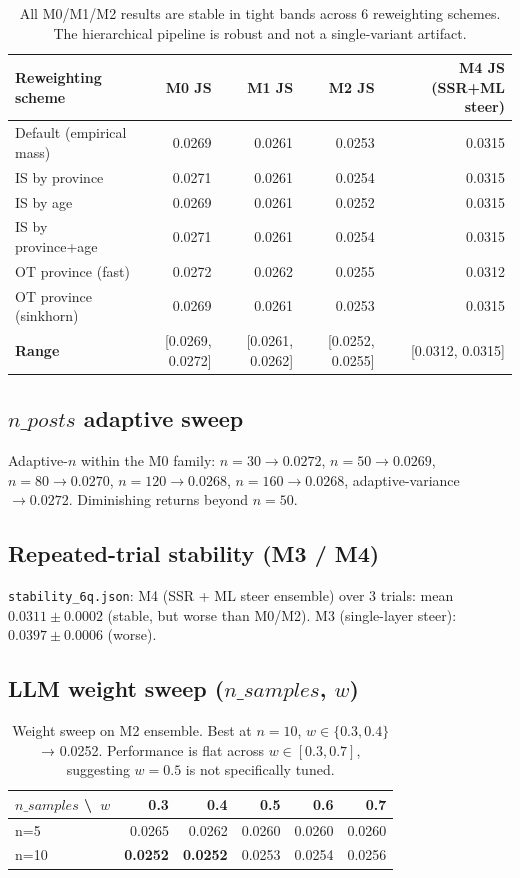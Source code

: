 \documentclass[10pt,a4paper]{article}
\newcommand{\good}[1]{\textcolor{green!50!black}{\textbf{#1}}}
\begin{document}
\begin{table}[H]
\centering
\small
\begin{tabular}{l r r r r}
\toprule
\textbf{Reweighting scheme} & \textbf{M0 JS} & \textbf{M1 JS} & \textbf{M2 JS} & \textbf{M4 JS (SSR+ML steer)} \\
\midrule
Default (empirical mass) & 0.0269 & 0.0261 & 0.0253 & 0.0315 \\
IS by province & 0.0271 & 0.0261 & 0.0254 & 0.0315 \\
IS by age & 0.0269 & 0.0261 & 0.0252 & 0.0315 \\
IS by province+age & 0.0271 & 0.0261 & 0.0254 & 0.0315 \\
OT province (fast) & 0.0272 & 0.0262 & 0.0255 & 0.0312 \\
OT province (sinkhorn) & 0.0269 & 0.0261 & 0.0253 & 0.0315 \\
\midrule
\textbf{Range} & [0.0269, 0.0272] & [0.0261, 0.0262] & [0.0252, 0.0255] & [0.0312, 0.0315] \\
\bottomrule
\end{tabular}
\caption{All M0/M1/M2 results are stable in tight bands across 6 reweighting schemes. The hierarchical pipeline is robust and not a single-variant artifact.}
\end{table}

\subsection{$n\_posts$ adaptive sweep}

Adaptive-$n$ within the M0 family: $n=30 \to 0.0272$, $n=50 \to 0.0269$, $n=80 \to 0.0270$, $n=120 \to 0.0268$, $n=160 \to 0.0268$, adaptive-variance $\to 0.0272$. Diminishing returns beyond $n{=}50$.

\subsection{Repeated-trial stability (M3 / M4)}

\texttt{stability\_6q.json}: M4 (SSR + ML steer ensemble) over 3 trials: mean $0.0311 \pm 0.0002$ (stable, but worse than M0/M2). M3 (single-layer steer): $0.0397 \pm 0.0006$ (worse).

\subsection{LLM weight sweep ($n\_samples$, $w$)}

\begin{table}[H]
\centering
\small
\begin{tabular}{l r r r r r}
\toprule
$n\_samples$ \textbackslash\ $w$ & 0.3 & 0.4 & 0.5 & 0.6 & 0.7 \\
\midrule
n=5  & 0.0265 & 0.0262 & 0.0260 & 0.0260 & 0.0260 \\
n=10 & \good{0.0252} & \good{0.0252} & 0.0253 & 0.0254 & 0.0256 \\
\bottomrule
\end{tabular}
\caption{Weight sweep on M2 ensemble. Best at $n{=}10$, $w\in\{0.3,0.4\}$ → 0.0252. Performance is flat across $w\in[0.3, 0.7]$, suggesting $w{=}0.5$ is not specifically tuned.}
\end{table}
\end{document}
